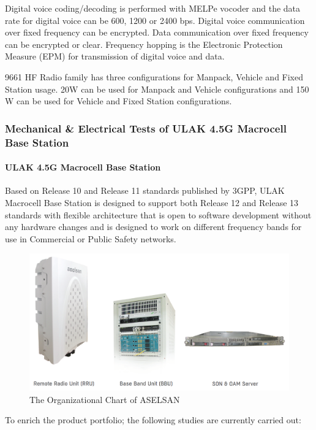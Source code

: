 	Digital voice coding/decoding is performed with MELPe vocoder and the data rate for digital voice can be 600, 1200 or 2400 bps. Digital voice communication over fixed frequency can be encrypted. Data communication over fixed frequency can be encrypted or clear. Frequency hopping is the Electronic Protection Measure (EPM) for transmission of digital voice and data.

	9661 HF Radio family has three configurations for Manpack, Vehicle and Fixed Station usage. 20W can be used for Manpack and Vehicle configurations and 150 W can be used for Vehicle and Fixed Station configurations.



\subsubsection{Mechanical \& Electrical Tests of ULAK 4.5G Macrocell Base Station  }

\paragraph{ULAK 4.5G Macrocell Base Station}
\- \indent
	Based on Release 10 and Release 11 standards published by 3GPP, ULAK Macrocell Base Station is designed to support both Release 12 and Release 13 standards with flexible architecture that is open to software development without any hardware changes and is designed to work on different frequency bands for use in Commercial or Public Safety networks.  

\begin{figure}[H]
	\center
	\setlength{\unitlength}{\textwidth} 
	\includegraphics[width=1.0\unitlength]{ulak}
	\caption{\label{fig:ulak}The Organizational Chart of ASELSAN }
\end{figure}	
	
	To enrich the product portfolio; the following studies are currently carried out:

